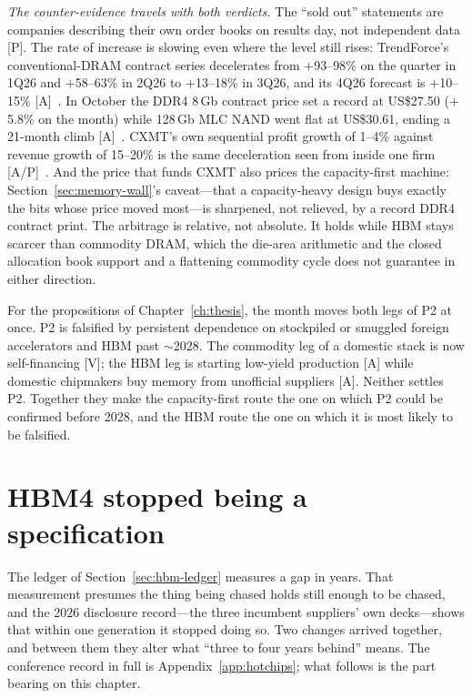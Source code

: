 \emph{The counter-evidence travels with both verdicts.} The ``sold out'' statements are companies describing their own order books on results day, not independent data [P]. The rate of increase is slowing even where the level still rises: TrendForce's conventional-DRAM contract series decelerates from $+$93--98\% on the quarter in 1Q26 and $+$58--63\% in 2Q26 to $+$13--18\% in 3Q26, and its 4Q26 forecast is $+$10--15\% [A]~\cite{trendforce-dram,hw-dram-prices}. In October the DDR4 8\,Gb contract price set a record at US\$27.50 ($+$5.8\% on the month) while 128\,Gb MLC NAND went flat at US\$30.61, ending a 21-month climb [A]~\cite{hw-dram-prices}. CXMT's own sequential profit growth of 1--4\% against revenue growth of 15--20\% is the same deceleration seen from inside one firm [A/P]~\cite{hw-cxmt-q3}. And the price that funds CXMT also prices the capacity-first machine: Section~\ref{sec:memory-wall}'s caveat---that a capacity-heavy design buys exactly the bits whose price moved most---is sharpened, not relieved, by a record DDR4 contract print. The arbitrage is relative, not absolute. It holds while HBM stays scarcer than commodity DRAM, which the die-area arithmetic and the closed allocation book support and a flattening commodity cycle does not guarantee in either direction.

For the propositions of Chapter~\ref{ch:thesis}, the month moves both legs of P2 at once. P2 is falsified by persistent dependence on stockpiled or smuggled foreign accelerators and HBM past ${\sim}$2028. The commodity leg of a domestic stack is now self-financing [V]; the HBM leg is starting low-yield production [A] while domestic chipmakers buy memory from unofficial suppliers [A]. Neither settles P2. Together they make the capacity-first route the one on which P2 could be confirmed before 2028, and the HBM route the one on which it is most likely to be falsified.

\section{HBM4 stopped being a specification}
\label{sec:hbm4-spread}

The ledger of Section~\ref{sec:hbm-ledger} measures a gap in years. That measurement presumes the thing being chased holds still enough to be chased, and the 2026 disclosure record---the three incumbent suppliers' own decks---shows that within one generation it stopped doing so. Two changes arrived together, and between them they alter what ``three to four years behind'' means. The conference record in full is Appendix~\ref{app:hotchips}; what follows is the part bearing on this chapter.

